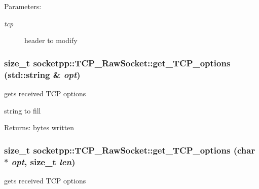 \begin{Desc}
\item[Parameters:]
\begin{description}
\item[{\em tcp}]header to modify \end{description}
\end{Desc}
\hypertarget{classsocketpp_1_1TCP__RawSocket_67ab79f764a710067590427cb35aeea0}{
\subsubsection[{get\_\-TCP\_\-options}]{\setlength{\rightskip}{0pt plus 5cm}size\_\-t socketpp::TCP\_\-RawSocket::get\_\-TCP\_\-options (std::string \& {\em opt})}}
\label{classsocketpp_1_1TCP__RawSocket_67ab79f764a710067590427cb35aeea0}


gets received TCP options 

string to fill \begin{Desc}
\item[Returns:]bytes written \end{Desc}
\hypertarget{classsocketpp_1_1TCP__RawSocket_75e954caea8187c5077821cd449199e7}{
\subsubsection[{get\_\-TCP\_\-options}]{\setlength{\rightskip}{0pt plus 5cm}size\_\-t socketpp::TCP\_\-RawSocket::get\_\-TCP\_\-options (char $\ast$ {\em opt}, \/  size\_\-t {\em len})}}
\label{classsocketpp_1_1TCP__RawSocket_75e954caea8187c5077821cd449199e7}


gets received TCP options 

